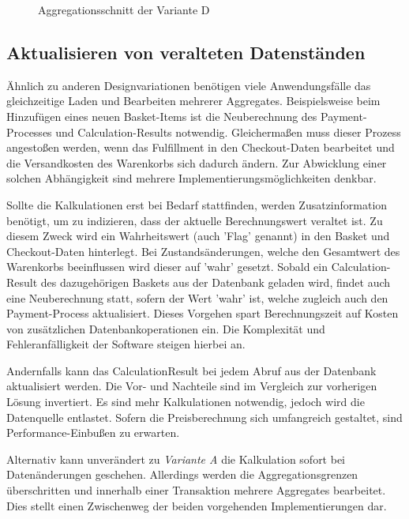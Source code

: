 \begin{figure}[htbp]
	\centering
	
	\caption{Aggregationsschnitt der Variante D}
	\label{fig:VarD}
\end{figure}

\subsection{Aktualisieren von veralteten Datenständen}

Ähnlich zu anderen Designvariationen benötigen viele Anwendungsfälle das gleichzeitige Laden und Bearbeiten mehrerer Aggregates. Beispielsweise beim Hinzufügen eines neuen Basket-Items ist die Neuberechnung des Payment-Processes und Calculation-Results notwendig. Gleichermaßen muss dieser Prozess angestoßen werden, wenn das Fulfillment in den Checkout-Daten bearbeitet und die Versandkosten des Warenkorbs sich dadurch ändern. Zur Abwicklung einer solchen Abhängigkeit sind mehrere Implementierungsmöglichkeiten denkbar.

Sollte die Kalkulationen erst bei Bedarf stattfinden, werden Zusatzinformation benötigt, um zu indizieren, dass der aktuelle Berechnungswert veraltet ist. Zu diesem Zweck wird ein Wahrheitswert (auch 'Flag' genannt) in den Basket und Checkout-Daten hinterlegt. Bei Zustandsänderungen, welche den Gesamtwert des Warenkorbs beeinflussen wird dieser auf 'wahr' gesetzt. Sobald ein Calculation-Result des dazugehörigen Baskets aus der Datenbank geladen wird, findet auch eine Neuberechnung statt, sofern der Wert 'wahr' ist, welche zugleich auch den Payment-Process aktualisiert. Dieses Vorgehen spart Berechnungszeit auf Kosten von zusätzlichen Datenbankoperationen ein. Die Komplexität und Fehleranfälligkeit der Software steigen hierbei an.

Andernfalls kann das CalculationResult bei jedem Abruf aus der Datenbank aktualisiert werden. Die Vor- und Nachteile sind im Vergleich zur vorherigen Lösung invertiert. Es sind mehr Kalkulationen notwendig, jedoch wird die Datenquelle entlastet. Sofern die Preisberechnung sich umfangreich gestaltet, sind Performance-Einbußen zu erwarten.

Alternativ kann unverändert zu \emph{Variante A} die Kalkulation sofort bei Datenänderungen geschehen. Allerdings werden die Aggregationsgrenzen überschritten und innerhalb einer Transaktion mehrere Aggregates bearbeitet. Dies stellt einen Zwischenweg der beiden vorgehenden Implementierungen dar.

